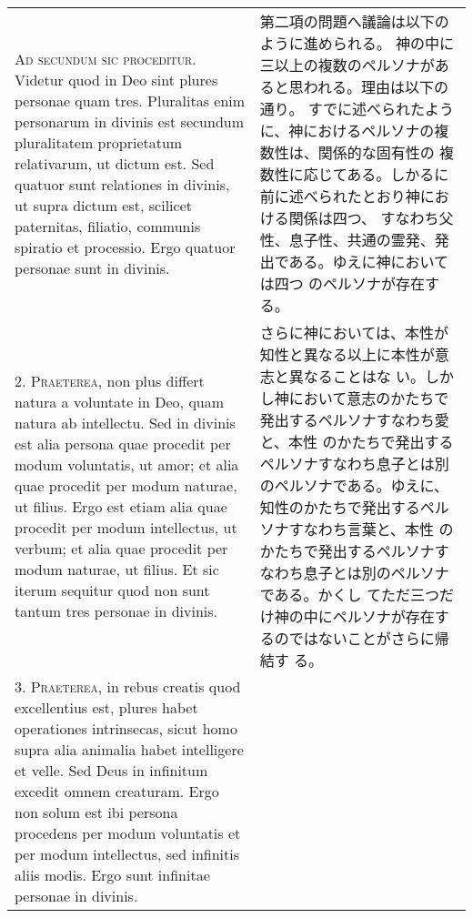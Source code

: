 \documentclass[10pt]{jsarticle} %
\begin{document}
\begin{longtable}{p{21em}p{21em}}

{\scshape Ad secundum sic proceditur}. Videtur quod in Deo sint plures personae
quam tres. Pluralitas enim personarum in divinis est secundum
pluralitatem proprietatum relativarum, ut dictum est. Sed quatuor sunt
relationes in divinis, ut supra dictum est, scilicet paternitas,
filiatio, communis spiratio et processio. Ergo quatuor personae sunt
in divinis.

&

第二項の問題へ議論は以下のように進められる。
神の中に三以上の複数のペルソナがあると思われる。理由は以下の通り。
すでに述べられたように、神におけるペルソナの複数性は、関係的な固有性の
 複数性に応じてある。しかるに前に述べられたとおり神における関係は四つ、
 すなわち父性、息子性、共通の霊発、発出である。ゆえに神においては四つ
 のペルソナが存在する。


\\



2. {\scshape Praeterea}, non plus differt natura a voluntate in Deo, quam natura ab
intellectu. Sed in divinis est alia persona quae procedit per modum
voluntatis, ut amor; et alia quae procedit per modum naturae, ut
filius. Ergo est etiam alia quae procedit per modum intellectus, ut
verbum; et alia quae procedit per modum naturae, ut filius. Et sic
iterum sequitur quod non sunt tantum tres personae in divinis.

&

さらに神においては、本性が知性と異なる以上に本性が意志と異なることはな
 い。しかし神において意志のかたちで発出するペルソナすなわち愛と、本性
 のかたちで発出するペルソナすなわち息子とは別のペルソナである。ゆえに、
 知性のかたちで発出するペルソナすなわち言葉と、本性
 のかたちで発出するペルソナすなわち息子とは別のペルソナである。かくし
 てただ三つだけ神の中にペルソナが存在するのではないことがさらに帰結す
 る。

\\



3. {\scshape Praeterea}, in rebus creatis quod excellentius est, plures habet
operationes intrinsecas, sicut homo supra alia animalia habet
intelligere et velle. Sed Deus in infinitum excedit omnem
creaturam. Ergo non solum est ibi persona procedens per modum
voluntatis et per modum intellectus, sed infinitis aliis modis. Ergo
sunt infinitae personae in divinis.

&


\end{longtable}
\end{document}
